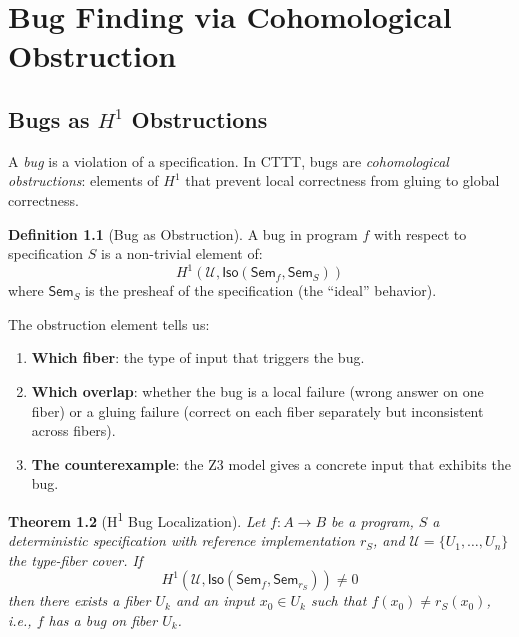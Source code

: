 \documentclass[11pt,a4paper]{report}
\theoremstyle{definition}
\newtheorem{definition}{Definition}[chapter]
\theoremstyle{plain}
\newtheorem{theorem}[definition]{Theorem}
\newcommand{\covers}{\mathcal{U}}
\newcommand{\Sem}{\mathsf{Sem}}
\newcommand{\Iso}{\mathsf{Iso}}
\newcommand{\Hone}{H^1}
\begin{document}
\chapter{Bug Finding via Cohomological Obstruction}
\label{ch:bug-finding}

\section{Bugs as $\Hone$ Obstructions}

A \emph{bug} is a violation of a specification.  In CTTT, bugs are
\emph{cohomological obstructions}: elements of $\Hone$ that prevent
local correctness from gluing to global correctness.

\begin{definition}[Bug as Obstruction]
A bug in program $f$ with respect to specification $S$ is a
non-trivial element of:
\[
  \Hone(\covers, \Iso(\Sem_f, \Sem_S))
\]
where $\Sem_S$ is the presheaf of the specification (the ``ideal''
behavior).
\end{definition}

The obstruction element tells us:
\begin{enumerate}
  \item \textbf{Which fiber}: the type of input that triggers the bug.
  \item \textbf{Which overlap}: whether the bug is a local failure
    (wrong answer on one fiber) or a gluing failure (correct on each
    fiber separately but inconsistent across fibers).
  \item \textbf{The counterexample}: the Z3 model gives a concrete
    input that exhibits the bug.
\end{enumerate}

\begin{theorem}[H\textsuperscript{1} Bug Localization]
\label{thm:h1-bug}
Let $f : A \to B$ be a program, $S$ a deterministic specification
with reference implementation $r_S$, and $\covers = \{U_1, \ldots,
U_n\}$ the type-fiber cover.  If
\[
  \Hone(\covers, \Iso(\Sem_f, \Sem_{r_S})) \neq 0
\]
then there exists a fiber $U_k$ and an input $x_0 \in U_k$ such that
$f(x_0) \neq r_S(x_0)$, i.e., $f$ has a bug on fiber $U_k$.
\end{theorem}
\end{document}
